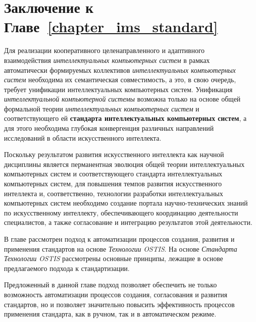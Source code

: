 \section*{Заключение к Главе~\ref{chapter_ims_standard}}

Для реализации кооперативного целенаправленного и адаптивного взаимодействия \textit{интеллектуальных компьютерных систем} в рамках автоматически формируемых коллективов \textit{интеллектуальных компьютерных систем} необходима их семантическая совместимость, а это, в свою очередь, требует унификации интеллектуальных компьютерных систем. Унификация \textit{интеллектуальной компьютерной системы} возможна только на основе общей формальной теории \textit{интеллектуальных компьютерных систем} и соответствующего ей \textbf{стандарта интеллектуальных компьютерных систем}, а для этого необходима глубокая конвергенция различных направлений исследований в области искусственного интеллекта.

Поскольку результатом развития искусственного интеллекта как научной дисциплины является перманентная эволюция общей теории интеллектуальных компьютерных систем и соответствующего стандарта интеллектуальных компьютерных систем, для повышения темпов развития искусственного интеллекта и, соответственно, технологии разработки интеллектуальных компьютерных систем необходимо создание портала научно-технических знаний по искусственному интеллекту, обеспечивающего координацию деятельности специалистов, а также согласование и интеграцию результатов этой деятельности.

В главе рассмотрен подход к автоматизации процессов создания, развития и применения стандартов на основе \textit{Технологии OSTIS}. На основе \textit{Стандарта Технологии OSTIS} рассмотрены основные принципы, лежащие в основе предлагаемого подхода к стандартизации.

Предложенный в данной главе подход позволяет обеспечить не только возможность автоматизации процессов создания, согласования и развития стандартов, но и позволяет значительно повысить эффективность процессов применения стандарта, как в ручном, так и в автоматическом режиме.

%
